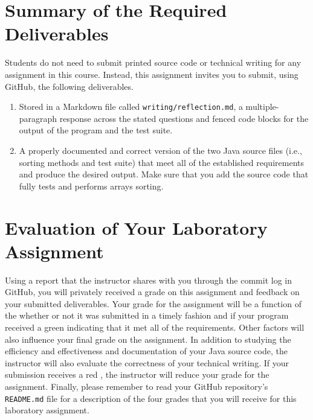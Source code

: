 \documentclass[11pt]{article}
\newcommand{\reflection}{\lstinline{writing/reflection.md}}
\newcommand{\program}[1]{\lstinline{#1}}
\newcommand{\checkmark}{\ding{51}}
\newcommand{\naughtmark}{\ding{55}}
\begin{document}
\section*{Summary of the Required Deliverables}

\noindent Students do not need to submit printed source code or technical
writing for any assignment in this course. Instead, this assignment invites you
to submit, using GitHub, the following deliverables.

\begin{enumerate}

  \setlength{\itemsep}{0in}

\item Stored in a Markdown file called \reflection{}, a multiple-paragraph
  response across the stated questions and fenced code blocks for the output of
  the program and the test suite.

\item A properly documented and correct version of the two Java source files
  (i.e., sorting methods and test suite) that meet all of the established
  requirements and produce the desired output.
  Make sure that you add the source code that fully tests and performs arrays
  sorting.

\end{enumerate}

\section*{Evaluation of Your Laboratory Assignment}

Using a report that the instructor shares with you through the commit log in
GitHub, you will privately received a grade on this assignment and feedback on
your submitted deliverables. Your grade for the assignment will be a function of
the whether or not it was submitted in a timely fashion and if your program
received a green \checkmark{} indicating that it met all of the requirements.
Other factors will also influence your final grade on the assignment. In
addition to studying the efficiency and effectiveness and documentation of your
Java source code, the instructor will also evaluate the correctness of your
technical writing. If your submission receives a red \naughtmark{}, the
instructor will reduce your grade for the assignment. Finally, please remember
to read your GitHub repository's \program{README.md} file for a description of
the four grades that you will receive for this laboratory assignment.
\end{document}
